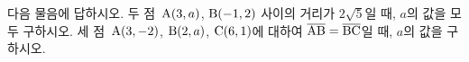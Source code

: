 다음 물음에 답하시오.
 두 점~$\mathrm{A}(3{,}\mkern3mu\mathopen{}a)$, $\mathrm{B}(-1{,}\mkern3mu\mathopen{}2)$ 사이의 거리가 $2\sqrt{5}$일 때, $a$의 값을 모두 구하시오.
 세 점~$\mathrm{A}(3{,}\mkern3mu\mathopen{}-2)$, $\mathrm{B}(2{,}\mkern3mu\mathopen{}a)$, $\mathrm{C}(6{,}\mkern3mu\mathopen{}1)$에 대하여 $\overline{\mathrm{AB}}=\overline{\mathrm{BC}}$일 때, $a$의 값을 구하시오.
